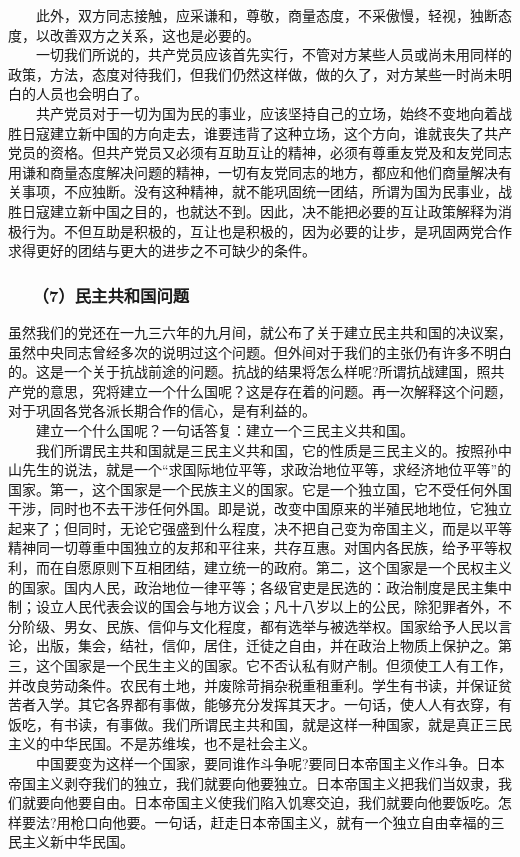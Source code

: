 \documentclass[cn,11pt,chinese]{elegantbook}
\def\myformat#1{\hfil\hfil #1}
\begin{document}
　　此外，双方同志接触，应采谦和，尊敬，商量态度，不采傲慢，轻视，独断态度，以改善双方之关系，这也是必要的。\\
　　一切我们所说的，共产党员应该首先实行，不管对方某些人员或尚未用同样的政策，方法，态度对待我们，但我们仍然这样做，做的久了，对方某些一时尚未明白的人员也会明白了。\\
　　共产党员对于一切为国为民的事业，应该坚持自己的立场，始终不变地向着战胜日寇建立新中国的方向走去，谁要违背了这种立场，这个方向，谁就丧失了共产党员的资格。但共产党员又必须有互助互让的精神，必须有尊重友党及和友党同志用谦和商量态度解决问题的精神，一切有友党同志的地方，都应和他们商量解决有关事项，不应独断。没有这种精神，就不能巩固统一团结，所谓为国为民事业，战胜日寇建立新中国之目的，也就达不到。因此，决不能把必要的互让政策解释为消极行为。不但互助是积极的，互让也是积极的，因为必要的让步，是巩固两党合作求得更好的团结与更大的进步之不可缺少的条件。\\
\subsubsection*{\myformat{　　（7）民主共和国问题}}
虽然我们的党还在一九三六年的九月间，就公布了关于建立民主共和国的决议案，虽然中央同志曾经多次的说明过这个问题。但外间对于我们的主张仍有许多不明白的。这是一个关于抗战前途的问题。抗战的结果将怎么样呢?所谓抗战建国，照共产党的意思，究将建立一个什么国呢？这是存在着的问题。再一次解释这个问题，对于巩固各党各派长期合作的信心，是有利益的。\\
　　建立一个什么国呢？一句话答复：建立一个三民主义共和国。\\
　　我们所谓民主共和国就是三民主义共和国，它的性质是三民主义的。按照孙中山先生的说法，就是一个“求国际地位平等，求政治地位平等，求经济地位平等”的国家。第一，这个国家是一个民族主义的国家。它是一个独立国，它不受任何外国干涉，同时也不去干涉任何外国。即是说，改变中国原来的半殖民地地位，它独立起来了；但同时，无论它强盛到什么程度，决不把自己变为帝国主义，而是以平等精神同一切尊重中国独立的友邦和平往来，共存互惠。对国内各民族，给予平等权利，而在自愿原则下互相团结，建立统一的政府。第二，这个国家是一个民权主义的国家。国内人民，政治地位一律平等；各级官吏是民选的：政治制度是民主集中制；设立人民代表会议的国会与地方议会；凡十八岁以上的公民，除犯罪者外，不分阶级、男女、民族、信仰与文化程度，都有选举与被选举权。国家给予人民以言论，出版，集会，结社，信仰，居住，迁徒之自由，并在政治上物质上保护之。第三，这个国家是一个民生主义的国家。它不否认私有财产制。但须使工人有工作，并改良劳动条件。农民有土地，并废除苛捐杂税重租重利。学生有书读，并保证贫苦者入学。其它各界都有事做，能够充分发挥其天才。一句话，使人人有衣穿，有饭吃，有书读，有事做。我们所谓民主共和国，就是这样一种国家，就是真正三民主义的中华民国。不是苏维埃，也不是社会主义。\\
　　中国要变为这样一个国家，要同谁作斗争呢?要同日本帝国主义作斗争。日本帝国主义剥夺我们的独立，我们就要向他要独立。日本帝国主义把我们当奴隶，我们就要向他要自由。日本帝国主义使我们陷入饥寒交迫，我们就要向他要饭吃。怎样要法?用枪口向他要。一句话，赶走日本帝国主义，就有一个独立自由幸福的三民主义新中华民国。\\
\end{document}
